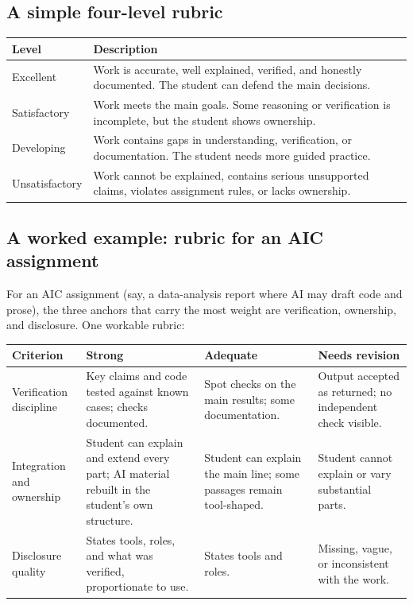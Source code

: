\documentclass{SIAMbook2023}
\begin{document}
\subsection{A simple four-level rubric}
\label{i:subsec:four-level-rubric}

\begin{center}
\begin{tabular}{p{}p{}}
\toprule
\textbf{Level} & \textbf{Description} \\
\midrule
Excellent & Work is accurate, well explained, verified, and honestly documented. The student can defend the main decisions. \\
Satisfactory & Work meets the main goals. Some reasoning or verification is incomplete, but the student shows ownership. \\
Developing & Work contains gaps in understanding, verification, or documentation. The student needs more guided practice. \\
Unsatisfactory & Work cannot be explained, contains serious unsupported claims, violates assignment rules, or lacks ownership. \\
\bottomrule
\end{tabular}
\end{center}


\subsection{A worked example: rubric for an AIC assignment}
\label{i:subsec:aic-rubric}%

For an AIC assignment (say, a data-analysis report where AI may draft code and prose), the three anchors that carry the most weight are verification, ownership, and disclosure. One workable rubric:

\begin{center}
\begin{tabularx}{\textwidth}{p{}XXX}
\toprule
\textbf{Criterion} & \textbf{Strong} & \textbf{Adequate} & \textbf{Needs revision} \\
\midrule
Verification discipline & Key claims and code tested against known cases; checks documented. & Spot checks on the main results; some documentation. & Output accepted as returned; no independent check visible. \\
\addlinespace
Integration and ownership & Student can explain and extend every part; AI material rebuilt in the student's own structure. & Student can explain the main line; some passages remain tool-shaped. & Student cannot explain or vary substantial parts. \\
\addlinespace
Disclosure quality & States tools, roles, and what was verified, proportionate to use. & States tools and roles. & Missing, vague, or inconsistent with the work. \\
\bottomrule
\end{tabularx}
\end{center}
\end{document}
